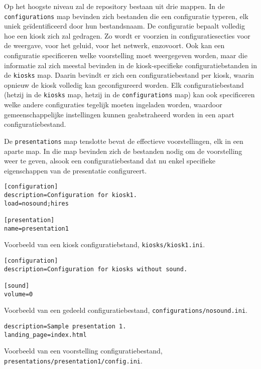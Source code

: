 Op het hoogste niveau zal de repository bestaan uit drie mappen. In de \texttt{configurations} map bevinden zich bestanden die een configuratie typeren, elk uniek geïdentificeerd door hun bestandsnaam. De configuratie bepaalt volledig hoe een kiosk zich zal gedragen. Zo wordt er voorzien in configuratiesecties voor de weergave, voor het geluid, voor het netwerk, enzovoort. Ook kan een configuratie specificeren welke voorstelling moet weergegeven worden, maar die informatie zal zich meestal bevinden in de kiosk-specifieke configuratiebstanden in de \texttt{kiosks} map. Daarin bevindt er zich een configuratiebestand per kiosk, waarin opnieuw de kiosk volledig kan geconfigureerd worden. Elk configuratiebestand (hetzij in de \texttt{kiosks} map, hetzij in de \texttt{configurations} map) kan ook specificeren welke andere configuraties tegelijk moeten ingeladen worden, waardoor gemeenschappelijke instellingen kunnen geabstraheerd worden in een apart configuratiebestand.

De \texttt{presentations} map tenslotte bevat de effectieve voorstellingen, elk in een aparte map. In die map bevinden zich de bestanden nodig om de voorstelling weer te geven, alsook een configuratiebestand dat nu enkel specifieke eigenschappen van de presentatie configureert.

\begin{code}
\begin{verbatim}
[configuration]
description=Configuration for kiosk1.
load=nosound;hires

[presentation]
name=presentation1
\end{verbatim}
\caption{Voorbeeld van een kiosk configuratiebstand, \texttt{kiosks/kiosk1.ini}.}
\end{code}

\begin{code}
\begin{verbatim}
[configuration]
description=Configuration for kiosks without sound.

[sound]
volume=0
\end{verbatim}
\caption{Voorbeeld van een gedeeld configuratiebestand, \texttt{configurations/nosound.ini}.}
\end{code}

\begin{code}
\begin{verbatim}
description=Sample presentation 1.
landing_page=index.html
\end{verbatim}
\caption{Voorbeeld van een voorstelling configuratiebestand, \texttt{presentations/presentation1/config.ini}.}
\end{code}

